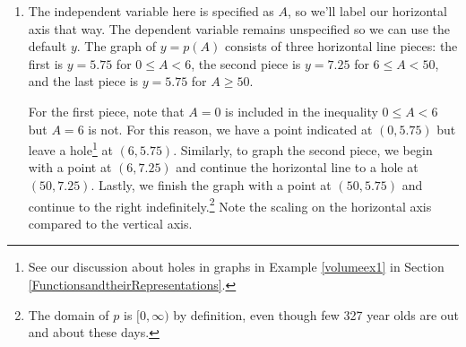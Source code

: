 \documentclass{ximera}
\begin{document}
\begin{example}
\begin{explanation}
\begin{enumerate}
\item   The independent variable here is specified as $A$, so we'll label our horizontal axis that way.  The dependent variable remains unspecified so we can use the default $y$.  The graph of $y = p(A)$ consists of three horizontal line pieces:  the first is $y = 5.75$ for $0 \leq A < 6$, the second piece is $y = 7.25$ for $6 \leq A < 50$, and the last piece is $y = 5.75$ for $A \geq 50$.  



For the first piece, note that $A = 0$ is included in the inequality $0 \leq A < 6$ but $A = 6$ is not.  For this reason, we have a point indicated at $(0, 5.75)$ but leave a hole\footnote{See our discussion about holes in graphs in Example \ref{volumeex1} in Section \ref{FunctionsandtheirRepresentations}.} at $(6, 5.75)$.  Similarly, to graph the second piece, we begin with a point at $(6, 7.25)$ and continue the horizontal line to a hole at $(50, 7.25)$.  Lastly,  we finish the graph with a point at $(50, 5.75)$ and continue to the right indefinitely.\footnote{The domain of $p$ is $[0, \infty)$ by definition, even though few 327 year olds are out and about these days.} Note the scaling on the horizontal axis compared to the vertical axis.

\begin{center}

\end{center}
\end{enumerate}
\end{explanation}
\end{example}
\end{document}
